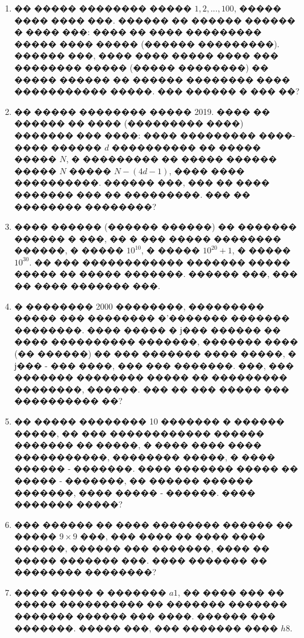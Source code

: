 \documentclass[a4paper,12pt]{article}
\begin{document}
\begin{enumerate}
\item �� ����� �������� ����� $1,2,...,100$, ����� ���� ���� ���. ������ �� ������ ������ � ���� ���: ���� �� ���� ��������� ����� ���� ����� (������ ���������). ������ ���, ���� ���� ����� ���� ��� �������� ����� (����� ��������) �� ����� ������ �� ������ �������� ���� ����������� �����. ��� ������ � ��� ��?

\item �� ����� �������� ����� 2019. ���� �� ������ �� ���� (��������� ����) ������� ��� ����: ���� ��������� ����-���� ������ $d$ ���������� �� ����� ����� $N$,  � ��������� �� ����� ������ ����� $N$ ����� $N-(4d-1)$, ���� ���� ����������. ������ ���, ��� �� ���� ������� ��� �� ���������. ��� �� �������� ��������?

\item ���� ������ (������ ������) �� ������� ������ � ���, �� � ��� ����� �������� ������, � ����� $10^{10}$, � ����� $10^{20}+1$, � ����� $10^{30}$. �� ��� ������������ ������� ����� ����� �� ����� �������. ������ ���, ��� �� ���� ������� ���.

\item � �������� 2000 ��������, ��������� ����� ��� �������� �'������� ������� ��������. ���� ����� � ϳ��� ������ �� ���� ���������� �������, ������� ���� (�� ������) �� ��� ������� ���� �����, � ϳ��� - ��� ����, ��� ��� �������. ���, ��� ������� �������� ����� �� ��������� ��������, ������. ��� �� ��� ����� ��� ���������� ��?

\item �� ����� �������� 10 ������� � ������ �����, �� ��� ������������ ������ ������� �� �����, � ���� ���� ���� �����������, �������� �����, � ���� ������ - �������. ���� ������� ����� �� ����� - �������, �� ������ ������ �������, ���� ����� - ������. ���� ������� �����?

\item ��� ������ �� ���� �������� ������ �� ����� $9\times 9$ ���, ��� ���� �� ���� ���� ������, ������ ��� �������, ���� �� ����� ������� ���. ���� ������� �� �������� ��������?

\item ���� ����� � ������� $a1$, �� ���� ��� �� ����� ���������� �� ������� ������� ������� ������ ��� ����. ������ ��� �������. ����� ���, ��� ������� ���� $h8$.
\end{enumerate}
\end{document}

